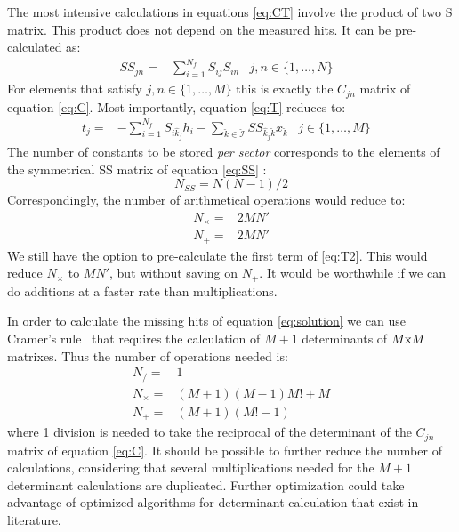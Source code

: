 \documentclass[a4paper,11pt]{article}
\begin{document}
The most intensive calculations in equations \eqref{eq:CT} involve the product of two S matrix.
This product does not depend on the measured hits.  It can be pre-calculated as:
\begin{align}
  \label{eq:SS}
  SS_{jn} = & \sum_{i=1}^{N_f} S_{ij}  S_{in}   & j,n \in \{1, \ldots, N \}   &
\end{align}
For elements that satisfy $ j,n \in \{ 1,\ldots, M \} $ this is exactly the $C_{j n}$ matrix of equation \eqref{eq:C}.
Most importantly, equation \eqref{eq:T} reduces to:
\begin{align}
  \label{eq:T2}
  t_{j } = & -\sum_{i=1}^{N_f} S_{i\hat k_j}h_i -  \sum_{\check k \in \check{\mathcal
        I}} SS_{\hat k_j\check k} x_{\check k} & j \in \{1, \ldots, M \} &
\end{align}
The number of constants to be stored \emph{per sector} corresponds to the elements of the symmetrical SS matrix of equation \eqref{eq:SS} :
\begin{equation}
  N_{SS} = N(N-1)/2
\end{equation}
Correspondingly, the number of arithmetical operations
would reduce to:
\begin{subequations}
  \begin{align}
    N_\times =& 2 M N' \\
    N_+ =& 2 M N'
  \end{align}
\end{subequations}
We still have the option to pre-calculate the first term of \eqref{eq:T2}. This would reduce $N_\times $ to $ M N'$, but without saving on $N_+$. It would be worthwhile if we can do additions at a faster rate than multiplications.

In order to calculate the missing hits of equation \eqref{eq:solution} we can use Cramer's rule~\cite{Cramer} that requires the calculation of $M+1$ determinants of $M{\rm x}M$ matrixes. Thus the number of operations needed is:
\begin{align}
  N_/ =& 1 \\
  N_\times =& (M+1) (M-1) M! + M \\
  N_+ =& (M+1) (M! -1) 
\end{align}
where 1 division is needed to take the reciprocal of the determinant of the $C_{j n}$ matrix of equation \eqref{eq:C}.
It should be possible to further reduce the number of calculations, considering that several multiplications needed for the $M+1$ determinant calculations are duplicated. Further optimization could take advantage of optimized algorithms for determinant calculation that exist in literature.
\end{document}
